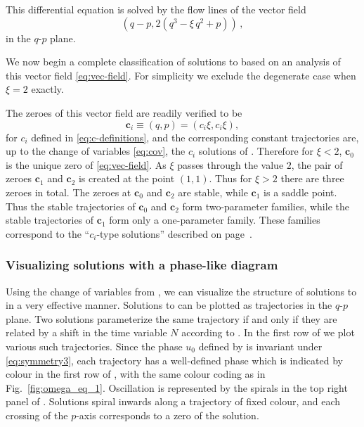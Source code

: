 This differential equation is solved by the flow lines of the vector field 
\begin{equation}
\left(q-p,2\left(q^{3}-\xi\,q^{2}+p\right)\right)\,,\label{eq:vec-field}
\end{equation}
in the $q$-$p$ plane.

We now begin a complete classification of solutions to  based on an analysis of this vector field \eqref{eq:vec-field}. For simplicity we exclude the degenerate case when $\xi=2$ exactly.

The zeroes of this vector field are readily verified to be 
\begin{equation}
\mathbf{c}_{i}\equiv\left(q,p\right)=\left(c_{i}\xi,c_{i}\xi\right),\label{eq:ci-points}
\end{equation}
for $c_{i}$ defined in \eqref{eq:c-definitions}, and the corresponding constant trajectories are, up to the change of variables \eqref{eq:cov}, the $c_{i}$ solutions of . Therefore for $\xi<2$, $\mathbf{c}_{0}$ is the unique zero of \eqref{eq:vec-field}. As $\xi$ passes through the value $2$, the pair of zeroes $\mathbf{c}_{1}$ and $\mathbf{c}_{2}$ is created at the point $(1,1)$. Thus for $\xi>2$ there are three zeroes in total. The zeroes at $\mathbf{c}_{0}$ and $\mathbf{c}_{2}$ are stable, while $\mathbf{c}_{1}$ is a saddle point. Thus the stable trajectories of $\mathbf{c}_{0}$ and $\mathbf{c}_{2}$ form two-parameter families, while the stable trajectories of $\mathbf{c}_{1}$ form only a one-parameter family. These families correspond to the ``$c_{i}$\nobreakdash-type solutions'' described on page~\pageref{c0typesol}.

\subsubsection*{Visualizing solutions with a phase-like diagram}

Using the change of variables from , we can visualize the structure of solutions to  in a very effective manner. Solutions to  can be plotted as trajectories in the $q$-$p$ plane. Two solutions parameterize the same trajectory if and only if they are related by a shift in the time variable $N$ according to . In the first row of  we plot various such trajectories. Since the phase $u_{0}$ defined by  is invariant under \eqref{eq:symmetry3}, each trajectory has a well-defined phase which is indicated by colour in the first row of , with the same colour coding as in Fig.~\ref{fig:omega_eq_1}. Oscillation is represented by the spirals in the top right panel of . Solutions spiral inwards along a trajectory of fixed colour, and each crossing of the $p$-axis corresponds to a zero of the solution.


